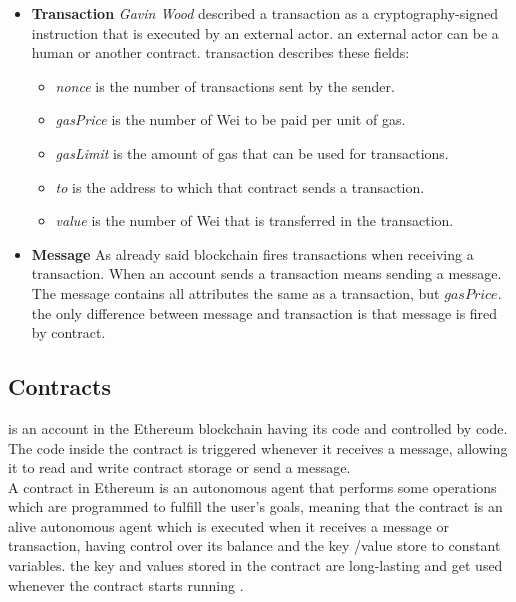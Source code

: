 \begin{itemize}
    \item \textbf{Transaction}
     \textit{Gavin Wood} described a transaction as a cryptography-signed instruction that is executed by an external actor. an external actor can be a human or another contract. transaction describes these fields:
     \begin{itemize}
         \item \textit{nonce} is the number of transactions sent by the sender.
         \item \textit{gasPrice} is the number of Wei to be paid per unit of gas.
         \item \textit{gasLimit} is the amount of gas that can be used for transactions.
         \item \textit{to} is the address to which that contract sends a transaction.
         \item \textit{value} is the number of Wei that is transferred in the transaction.
     \end{itemize}
        \item \textbf{Message}
        As already said blockchain fires transactions when receiving a transaction. When an account sends a transaction means sending a message. The message contains all attributes the same as a transaction, but $gasPrice$. the only difference between message and transaction is that message is fired by contract\cite{Egbertsen}.
\end{itemize}
\subsection{Contracts}  is an account in the Ethereum blockchain having its code and controlled by code. The code inside the contract is triggered whenever it receives a message, allowing it to read and write contract storage or send a message. \\
A contract in Ethereum is an autonomous agent that performs some operations which are programmed to fulfill the user's goals, meaning that the contract is an alive autonomous agent which is executed when it receives a message or transaction,  having control over its balance and the key /value store to constant variables.
the key and values stored in the contract are long-lasting and get used whenever the contract starts running \cite{Egbertsen}.

